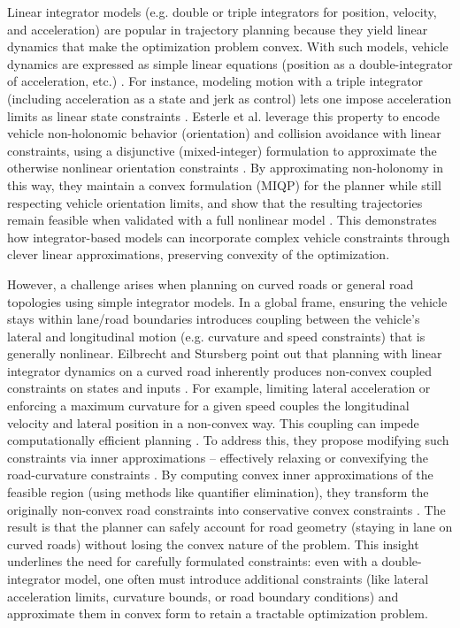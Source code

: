 Linear integrator models (e.g. double or triple integrators for position, velocity, and acceleration) are popular in trajectory planning because they
yield linear dynamics that make the optimization problem convex.
With such models, vehicle dynamics are expressed as simple linear equations (position as a double-integrator of acceleration, etc.)
.
For instance, modeling motion with a triple integrator (including acceleration as a state and jerk as control) lets one impose acceleration limits as
linear state constraints \cite{esterle_optimal_2020}.
Esterle et al.
leverage this property to encode vehicle non-holonomic behavior (orientation) and collision avoidance with linear constraints,
using a disjunctive (mixed-integer) formulation to approximate the otherwise nonlinear orientation constraints \cite{esterle_optimal_2020}.
By approximating non-holonomy in this way, they maintain a convex formulation (MIQP) for the planner while still respecting vehicle orientation
limits, and show that the resulting trajectories remain feasible when validated with a full nonlinear model \cite{esterle_optimal_2020}.
This demonstrates how integrator-based models can incorporate complex vehicle constraints through clever linear approximations, preserving convexity
of the optimization.

However, a challenge arises when planning on curved roads or general road topologies using simple integrator models.
In a global frame, ensuring the vehicle stays within lane/road boundaries introduces coupling between the vehicle's lateral and longitudinal motion
(e.g. curvature and speed constraints) that is generally nonlinear.
Eilbrecht and Stursberg point out that planning with linear integrator dynamics on a curved road inherently produces non-convex coupled constraints
on states and inputs \cite{eilbrecht_challenges_2020}.
For example, limiting lateral acceleration or enforcing a maximum curvature for a given speed couples the longitudinal velocity and lateral position
in a non-convex way.
This coupling can impede computationally efficient planning \cite{eilbrecht_challenges_2020}.
To address this, they propose modifying such constraints via inner approximations – effectively relaxing or convexifying the road-curvature
constraints \cite{eilbrecht_challenges_2020}.
By computing convex inner approximations of the feasible region (using methods like quantifier elimination), they transform the originally non-convex
road constraints into conservative convex constraints \cite{eilbrecht_challenges_2020}.
The result is that the planner can safely account for road geometry (staying in lane on curved roads) without losing the convex nature of the
problem.
This insight underlines the need for carefully formulated constraints: even with a double-integrator model, one often must introduce additional
constraints (like lateral acceleration limits, curvature bounds, or road boundary conditions) and approximate them in convex form to retain a
tractable optimization problem.

